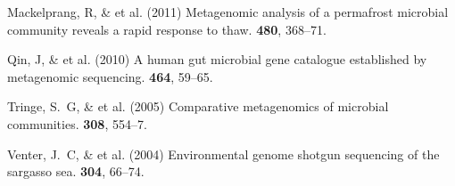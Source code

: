 \documentclass{pnastwo}
\begin{document}
\begin{article}
\begin{thebibliography}{10}
 Mackelprang, R, \& et al.
\newblock (2011) Metagenomic analysis of a permafrost microbial community
reveals a rapid response to thaw.  {\bf 480}, 368--71.


 Qin, J, \& et al. \newblock
(2010) A human gut microbial gene catalogue established by metagenomic
sequencing.  {\bf 464}, 59--65.
%


 Tringe, S.~G, \& et al. \newblock (2005) Comparative
metagenomics of microbial communities.  {\bf 308},
554--7.
%
%


 Venter, J.~C, \& et al. \newblock (2004) Environmental genome shotgun sequencing of the sargasso
sea.  {\bf 304}, 66--74.
%


\end{thebibliography}
\end{article}
\end{document}
